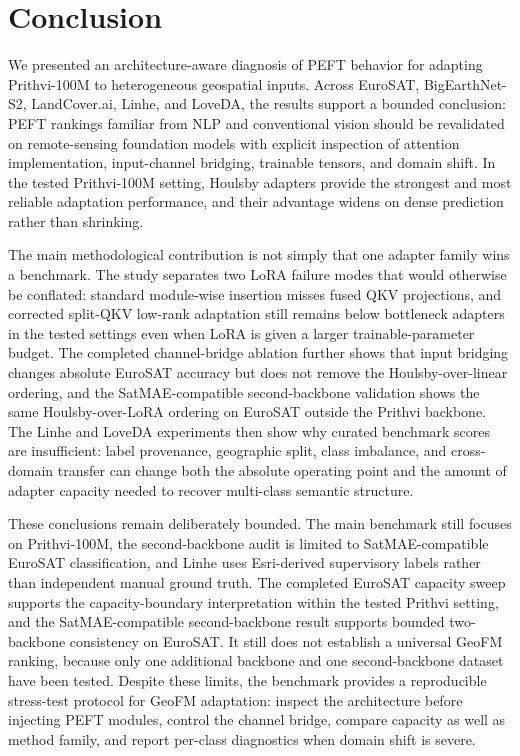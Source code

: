 \section{Conclusion}

We presented an architecture-aware diagnosis of PEFT behavior for adapting Prithvi-100M to heterogeneous geospatial inputs. Across EuroSAT, BigEarthNet-S2, LandCover.ai, Linhe, and LoveDA, the results support a bounded conclusion: PEFT rankings familiar from NLP and conventional vision should be revalidated on remote-sensing foundation models with explicit inspection of attention implementation, input-channel bridging, trainable tensors, and domain shift. In the tested Prithvi-100M setting, Houlsby adapters provide the strongest and most reliable adaptation performance, and their advantage widens on dense prediction rather than shrinking.

The main methodological contribution is not simply that one adapter family wins a benchmark. The study separates two LoRA failure modes that would otherwise be conflated: standard module-wise insertion misses fused QKV projections, and corrected split-QKV low-rank adaptation still remains below bottleneck adapters in the tested settings even when LoRA is given a larger trainable-parameter budget. The completed channel-bridge ablation further shows that input bridging changes absolute EuroSAT accuracy but does not remove the Houlsby-over-linear ordering, and the SatMAE-compatible second-backbone validation shows the same Houlsby-over-LoRA ordering on EuroSAT outside the Prithvi backbone. The Linhe and LoveDA experiments then show why curated benchmark scores are insufficient: label provenance, geographic split, class imbalance, and cross-domain transfer can change both the absolute operating point and the amount of adapter capacity needed to recover multi-class semantic structure.

These conclusions remain deliberately bounded. The main benchmark still focuses on Prithvi-100M, the second-backbone audit is limited to SatMAE-compatible EuroSAT classification, and Linhe uses Esri-derived supervisory labels rather than independent manual ground truth. The completed EuroSAT capacity sweep supports the capacity-boundary interpretation within the tested Prithvi setting, and the SatMAE-compatible second-backbone result supports bounded two-backbone consistency on EuroSAT. It still does not establish a universal GeoFM ranking, because only one additional backbone and one second-backbone dataset have been tested. Despite these limits, the benchmark provides a reproducible stress-test protocol for GeoFM adaptation: inspect the architecture before injecting PEFT modules, control the channel bridge, compare capacity as well as method family, and report per-class diagnostics when domain shift is severe.
